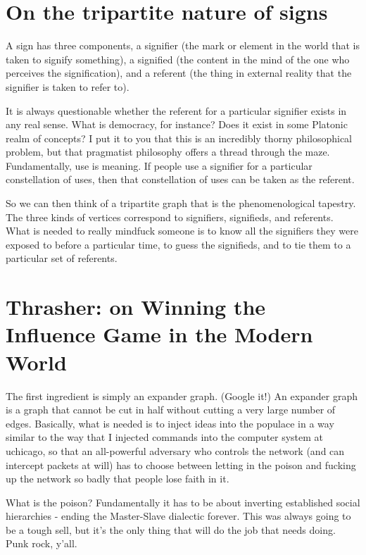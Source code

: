 \documentclass{article}
\begin{document}
\section{On the tripartite nature of signs}

A sign has three components, a signifier (the mark or element in the
world that is taken to signify something), a signified (the content in
the mind of the one who perceives the signification), and a referent
(the thing in external reality that the signifier is taken to refer
to).

It is always questionable whether the referent for a particular
signifier exists in any real sense. What is democracy, for instance?
Does it exist in some Platonic realm of concepts? I put it to you that
this is an incredibly thorny philosophical problem, but that
pragmatist philosophy offers a thread through the maze. Fundamentally,
use is meaning. If people use a signifier for a particular
constellation of uses, then that constellation of uses can be taken as
the referent.

So we can then think of a tripartite graph that is the
phenomenological tapestry. The three kinds of vertices correspond to
signifiers, signifieds, and referents. What is needed to really
mindfuck someone is to know all the signifiers they were exposed to
before a particular time, to guess the signifieds, and to tie them to
a particular set of referents.

\section{Thrasher: on Winning the Influence Game in the Modern World}

The first ingredient is simply an expander graph. (Google it!) An
expander graph is a graph that cannot be cut in half without cutting a
very large number of edges. Basically, what is needed is to inject
ideas into the populace in a way similar to the way that I injected
commands into the computer system at uchicago, so that an all-powerful
adversary who controls the network (and can intercept packets at will)
has to choose between letting in the poison and fucking up the network
so badly that people lose faith in it.

What is the poison? Fundamentally it has to be about inverting
established social hierarchies - ending the Master-Slave dialectic
forever. This was always going to be a tough sell, but it's the only
thing that will do the job that needs doing. Punk rock, y'all.
\end{document}
